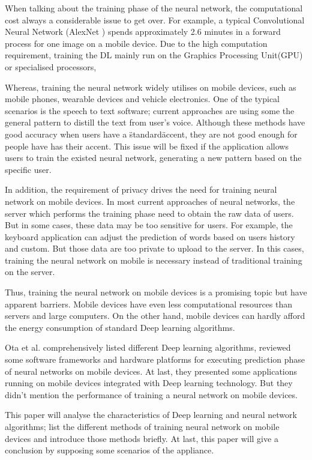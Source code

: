 \documentclass[article]{aaltoseries}
\begin{document}
When talking about the training phase of the neural network, the computational cost always a considerable
issue to get over. For example, a typical Convolutional Neural Network (AlexNet \cite{NIPS2012_4824}) 
spends approximately 2.6 minutes in a forward process for one image on a mobile device\cite{lane2015early}.
Due to the high computation requirement, training the DL mainly run on the Graphics Processing Unit(GPU) or specialised processors, 


Whereas, training the neural network widely utilises on mobile devices, 
such as mobile phones, wearable devices and vehicle electronics. 
One of the typical scenarios is the speech to text software; current approaches are using some the general 
pattern to distill the text from user's voice. Although these methods have good accuracy when users have
a \"standard\" accent, they are not good enough for people have has their accent. This issue will be
fixed if the application allows users to train the existed neural network, generating a new pattern based on 
the specific user.

In addition, the requirement of privacy drives the need for training neural network on mobile devices.
In most current approaches of neural networks, the server which performs the training phase need to obtain
the raw data of users. But in some cases, these data may be too sensitive for users. For example, the keyboard
application can adjust the prediction of words based on users history and custom. But those data are too 
private to upload to the server. In this cases, training the neural network on mobile is necessary instead of 
traditional training on the server.


Thus, training the neural network on mobile devices is a promising topic but have apparent barriers. 
Mobile devices have even less computational resources than 
servers and large computers. On the other hand, mobile devices can hardly afford the energy consumption
of standard Deep learning algorithms. 

Ota et al.\cite{Ota:2017} comprehensively listed different Deep learning algorithms,
reviewed some software frameworks and hardware platforms for executing prediction phase of neural networks on mobile devices.
At last, they presented some applications running on mobile devices integrated with Deep learning technology. 
But they didn't mention the performance of training a neural network on mobile devices. 

This paper will analyse the characteristics of Deep learning and neural network algorithms;
list the different methods of training neural network on mobile devices and introduce those methods briefly. 
At last, this paper will give a conclusion by supposing some scenarios of the appliance.
\end{document}
